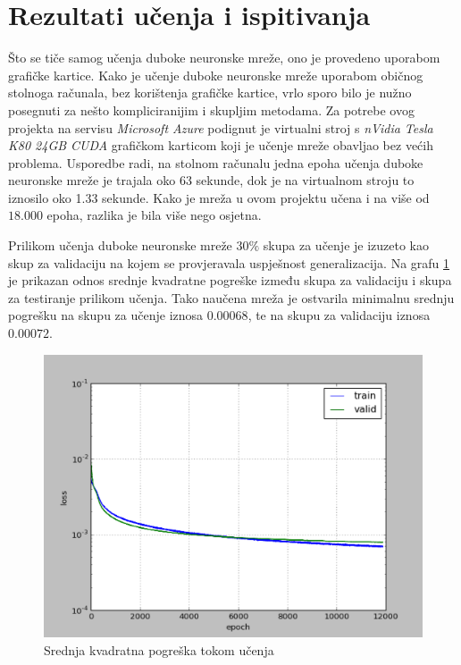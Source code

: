 \documentclass[times, utf8, zavrsni, numeric]{fer}
\begin{document}
\section{Rezultati učenja i ispitivanja}

Što se tiče samog učenja duboke neuronske mreže, ono je provedeno uporabom grafičke kartice. Kako je učenje duboke neuronske mreže uporabom običnog stolnoga računala, bez korištenja grafičke kartice, vrlo sporo bilo je nužno posegnuti za nešto kompliciranijim i skupljim metodama. Za potrebe ovog projekta na servisu \emph{Microsoft Azure} podignut je virtualni stroj s \emph{nVidia Tesla K80 24GB CUDA} grafičkom karticom koji je učenje mreže obavljao bez većih problema. Usporedbe radi, na stolnom računalu jedna epoha učenja duboke neuronske mreže je trajala oko 63 sekunde, dok je na virtualnom stroju to iznosilo oko 1.33 sekunde. Kako je mreža u ovom projektu učena i na više od $18.000$ epoha, razlika je bila više nego osjetna.

Prilikom učenja duboke neuronske mreže $30\%$ skupa za učenje je izuzeto kao skup za validaciju na kojem se provjeravala uspješnost generalizacija. Na grafu \ref{fig:lc} je prikazan odnos srednje kvadratne pogreške između skupa za validaciju i skupa za testiranje prilikom učenja. Tako naučena mreža je ostvarila minimalnu srednju pogrešku na skupu za učenje iznosa $0.00068$, te na skupu za validaciju iznosa $0.00072$.

\begin{figure}[htb]
    \centering
    \includegraphics[width=14cm]{images/l_curves.png}
    \caption{Srednja kvadratna pogreška tokom učenja}
    \label{fig:lc}
\end{figure}
\end{document}

